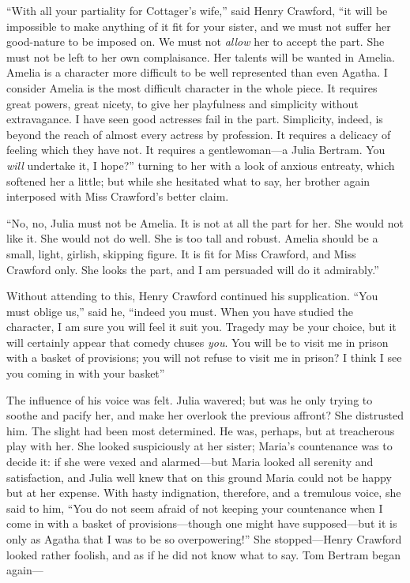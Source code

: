 \documentclass{article}
\begin{document}
``With all your partiality for Cottager's wife,''
said Henry Crawford, ``it will be impossible to make
anything of it fit for your sister, and we must not suffer
her good-nature to be imposed on.  We must not \emph{allow}
her to accept the part.  She must not be left to her
own complaisance.  Her talents will be wanted in Amelia.
Amelia is a character more difficult to be well represented
than even Agatha.  I consider Amelia is the most difficult
character in the whole piece.  It requires great powers,
great nicety, to give her playfulness and simplicity
without extravagance.  I have seen good actresses fail
in the part.  Simplicity, indeed, is beyond the reach
of almost every actress by profession.  It requires
a delicacy of feeling which they have not.  It requires
a gentlewoman---a Julia Bertram.  You \emph{will} undertake it,
I hope?'' turning to her with a look of anxious entreaty,
which softened her a little; but while she hesitated
what to say, her brother again interposed with Miss
Crawford's better claim.

``No, no, Julia must not be Amelia.  It is not at
all the part for her.  She would not like it.
She would not do well.  She is too tall and robust.
Amelia should be a small, light, girlish, skipping figure.
It is fit for Miss Crawford, and Miss Crawford only.
She looks the part, and I am persuaded will do it admirably.''

Without attending to this, Henry Crawford continued
his supplication.  ``You must oblige us,'' said he,
``indeed you must.  When you have studied the character, I am
sure you will feel it suit you.  Tragedy may be your choice,
but it will certainly appear that comedy chuses \emph{you}.
You will be to visit me in prison with a basket of provisions;
you will not refuse to visit me in prison?  I think I
see you coming in with your basket''

The influence of his voice was felt.  Julia wavered;
but was he only trying to soothe and pacify her, and make
her overlook the previous affront?  She distrusted him.
The slight had been most determined.  He was, perhaps,
but at treacherous play with her.  She looked suspiciously
at her sister; Maria's countenance was to decide it:
if she were vexed and alarmed---but Maria looked all
serenity and satisfaction, and Julia well knew that on
this ground Maria could not be happy but at her expense.
With hasty indignation, therefore, and a tremulous voice,
she said to him, ``You do not seem afraid of not
keeping your countenance when I come in with a basket
of provisions---though one might have supposed---but it
is only as Agatha that I was to be so overpowering!''
She stopped---Henry Crawford looked rather foolish,
and as if he did not know what to say.  Tom Bertram
began again---%
\end{document}
